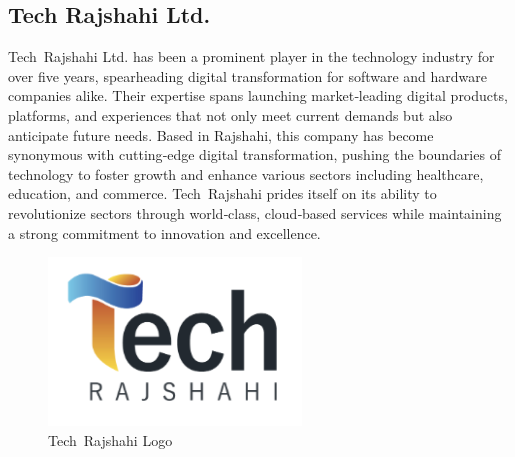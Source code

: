 \documentclass[12pt,a4paper]{article}
\begin{document}
\subsection{Tech Rajshahi Ltd.}
Tech Rajshahi Ltd. has been a prominent player in the technology industry for over five years, spearheading digital transformation for software and hardware companies alike.  Their expertise spans launching market‑leading digital products, platforms, and experiences that not only meet current demands but also anticipate future needs.  Based in Rajshahi, this company has become synonymous with cutting‑edge digital transformation, pushing the boundaries of technology to foster growth and enhance various sectors including healthcare, education, and commerce.  Tech Rajshahi prides itself on its ability to revolutionize sectors through world‑class, cloud‑based services while maintaining a strong commitment to innovation and excellence.

\begin{figure}[H]
    \centering
    \includegraphics[width=0.6\textwidth]{Fig/tech_rajshahi_logo.png}
    \caption{Tech Rajshahi Logo}
    \label{fig:tech_rajshahi_logo}
\end{figure}
\end{document}
